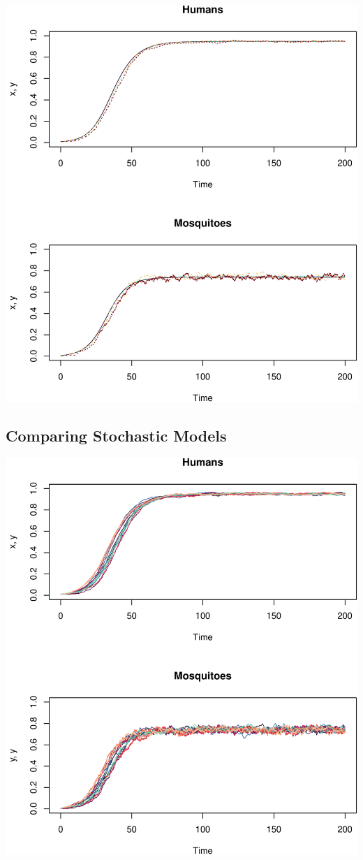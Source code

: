 \documentclass[
]{book}
\begin{document}
\includegraphics{docs/figs/unnamed-chunk-65-1.pdf}

\subsection{Comparing Stochastic Models}\label{comparing-stochastic-models}

\includegraphics{docs/figs/unnamed-chunk-66-1.pdf}
\end{document}
